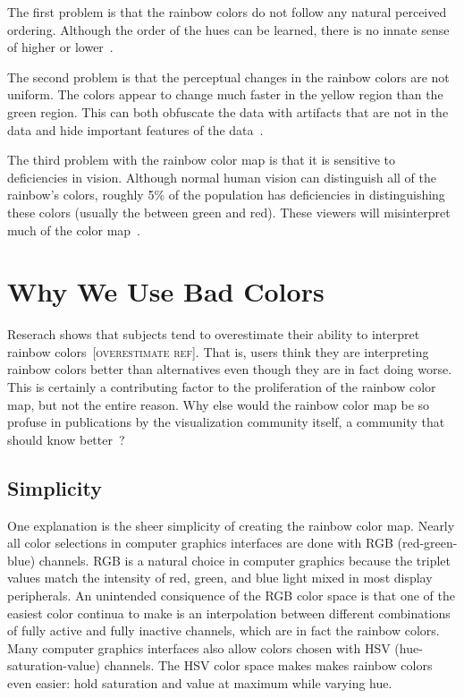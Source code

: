 \documentclass[letterpaper,twocolumn,fleqn]{article}
\newcommand*{\lcite}[1]{~\cite{#1}}
\newcommand{\fix}[1]{{\color{red}\textsc{[#1]}}}
\begin{document}
The first problem is that the rainbow colors do not follow any natural
perceived ordering. Although the order of the hues can be learned, there is
no innate sense of higher or lower\lcite{Ware2004}.

The second problem is that the perceptual changes in the rainbow colors are
not uniform. The colors appear to change much faster in the yellow region
than the green region. This can both obfuscate the data with artifacts that
are not in the data and hide important features of the
data\lcite{Borland2007}.

The third problem with the rainbow color map is that it is sensitive to
deficiencies in vision. Although normal human vision can distinguish all of
the rainbow's colors, roughly 5\% of the population has deficiencies in
distinguishing these colors (usually the between green and red). These
viewers will misinterpret much of the color map\lcite{Light2004}.


\section{Why We Use Bad Colors}

\noindent
Reserach shows that subjects tend to overestimate their ability to
interpret rainbow colors\lcite{Borkin2011}\fix{overestimate ref}. That is,
users think they are interpreting rainbow colors better than alternatives
even though they are in fact doing worse. This is certainly a contributing
factor to the proliferation of the rainbow color map, but not the entire
reason. Why else would the rainbow color map be so profuse in publications
by the visualization community itself, a community that should know
better\lcite{Borland2007}?

\subsection{Simplicity}

\noindent
One explanation is the sheer simplicity of creating the rainbow color map.
Nearly all color selections in computer graphics interfaces are done with
RGB (red-green-blue) channels. RGB is a natural choice in computer graphics
because the triplet values match the intensity of red, green, and blue
light mixed in most display peripherals. An unintended consiquence of the
RGB color space is that one of the easiest color continua to make is an
interpolation between different combinations of fully active and fully
inactive channels, which are in fact the rainbow colors. Many computer
graphics interfaces also allow colors chosen with HSV
(hue-saturation-value) channels. The HSV color space makes makes rainbow
colors even easier: hold saturation and value at maximum while varying hue.
\end{document}
